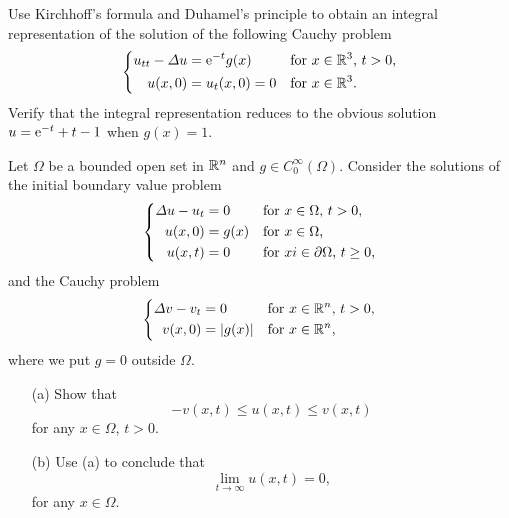 \begin{problem}
  Use Kirchhoff's formula and Duhamel's principle to obtain an integral
  representation of the solution of the following Cauchy problem
  \[
    \left\{
      \begin{aligned}
        u_{tt}-\Lap u&=\rme^{-t} g(x)&&\text{for \(x\in\R^3\), \(t>0\),}\\
        u(x,0)&=u_t(x,0)=0&&\text{for \(x\in\R^3\).}
      \end{aligned}
    \right.
  \]
  Verify that the integral representation reduces to the obvious solution
  \(u=\mathrm{e}^{-t}+t-1\) when \(g(x)=1\).
\end{problem}
\begin{solution*}
\end{solution*}

\begin{problem}
  Let \(\Omega\) be a bounded open set in \(\mathbb{R}^n\) and \(g\in
  C_0^\infty(\Omega)\). Consider the solutions of the initial boundary
  value problem
  \[
    \left\{
      \begin{aligned}
        \Lap u-u_t&=0&&\text{for \(x\in\Omega\), \(t>0\),}\\
        u(x,0)&=g(x)&&\text{for \(x\in\Omega\),}\\
        u(x,t)&=0&&\text{for \(xi\in\partial\Omega\), \(t\geq 0\),}
      \end{aligned}
    \right.
  \]
  and the Cauchy problem
  \[
    \left\{
      \begin{aligned}
        \Lap v-v_t&=0&&\text{for \(x\in\R^n\), \(t>0\),}\\
        v(x,0)&=|g(x)|&&\text{for \(x\in\R^n\),}
      \end{aligned}
    \right.
  \]
  where we put \(g=0\) outside \(\Omega\).
  \begin{itemize}[noitemsep]
  \item[(a)] Show that
    \[
      -v(x,t)\leq u(x,t)\leq v(x,t)
    \]
    for any \(x\in\Omega\), \(t>0\).
  \item[(b)] Use (a) to conclude that
    \[
      \lim_{t\to\infty} u(x,t)=0,
    \]
    for any \(x\in\Omega\).
  \end{itemize}
\end{problem}
\begin{solution*}
\end{solution*}

